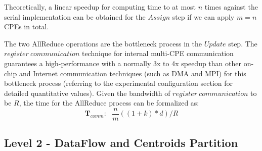 \documentclass[10pt,journal,compsoc]{IEEEtran}
\begin{document}
Theoretically, a linear speedup for computing time to at most $n$ times against the serial implementation can be obtained for the $Assign$ step if we can apply $m = n$ CPEs in total.

The two AllReduce operations are the bottleneck process in the $Update$ step. The $register\ communication$ technique for internal multi-CPE communication guarantees a high-performance with a normally 3x to 4x speedup than other on-chip and Internet communication techniques (such as DMA and MPI) for this bottleneck process (referring to the experimental configuration section for detailed quantitative values). 
Given the bandwidth of $register\ communication$ to be $R$, the time for the AllReduce process can be formalized as:
$$\mathbf{T}_{comm}:\ \ \ \frac{n}{m}((1+k)*d)/R$$

\subsection{Level 2 - DataFlow and Centroids Partition}
\end{document}
